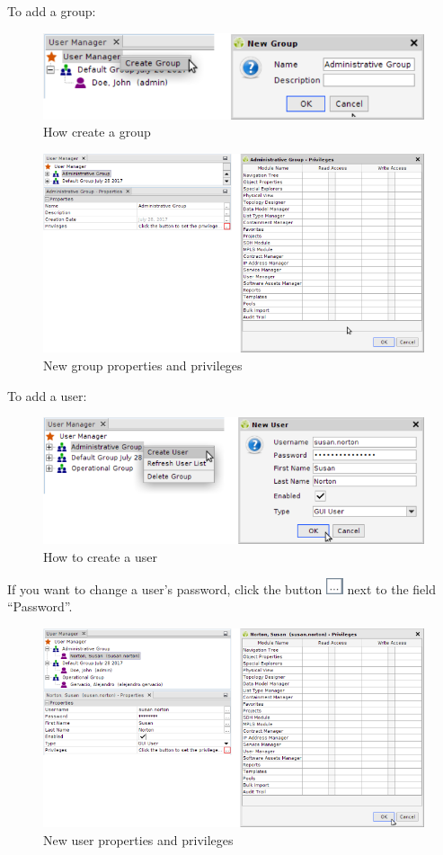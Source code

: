 \documentclass[a4paper]{article}
\begin{document}
		To add a group:
		\begin{figure}[h!]
			\centering
			\includegraphics[width=0.5\linewidth]{img/user_manager_new_group.png}
			\caption{How create a group}
			\label{fig:user_manager_new_group}
		\end{figure}
		
		\begin{figure}[h!]
			\centering
			\includegraphics[width=0.7\linewidth]{img/user_manager_group_properties_privileges.png}
			\caption{New group properties and privileges}
			\label{fig:user_manager_group_properties_privileges}
		\end{figure}
		
		To add a user:
		\begin{figure}[h!]
			\centering
			\includegraphics[width=0.5\linewidth]{img/user_manager_new_user.png}
			\caption{How to create a user}
			\label{fig:user_manager_new_user}
		\end{figure}
		
		If you want to change a user's password, click the button \includegraphics[width=0.5cm]{img/icon_edit_user.png} next to the field “Password”.
		\begin{figure}[h!]
			\centering
			\includegraphics[width=0.7\linewidth]{img/user_manager_user_properties_privileges.png}
			\caption{New user properties and privileges}
			\label{fig:user_manager_user_properties_privileges}
		\end{figure}
		
\end{document}
